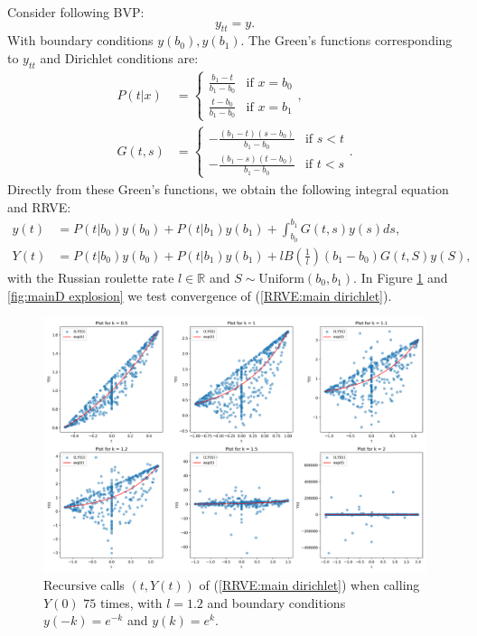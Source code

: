 \documentclass[a4paper,12pt]{article}
\begin{document}
\begin{example}[Dirichlet $y_{tt}=y$] \label{main dirichlet}
  Consider following BVP:
  \begin{equation} \label{eq:main dirichlet}
    y_{tt}=y.
  \end{equation}
  With boundary conditions $y(b_{0}),y(b_{1})$. The Green's functions corresponding to $y_{tt}$ and Dirichlet conditions are:
  \begin{align}
    P(t|x) & = \begin{cases}
                 \frac{b_{1}-t}{b_{1}-b_{0}} & \text{if } x = b_{0} \\
                 \frac{t-b_{0}}{b_{1}-b_{0}} & \text{if } x = b_{1}
               \end{cases},       \\
    G(t,s) & = \begin{cases}
                 -\frac{(b_{1}-t)(s-b_{0})}{b_{1}-b_{0}} & \text{if } s<t \\
                 -\frac{(b_{1}-s)(t-b_{0})}{b_{1}-b_{0}} & \text{if } t<s
               \end{cases}.
  \end{align}
  Directly from these Green's functions, we obtain the following integral equation and RRVE:
  \begin{align} \label{inteq:main dirichlet}
    y(t) & = P(t|b_{0}) y(b_{0}) + P(t|b_{1}) y(b_{1}) +
    \int_{b_{0}}^{b_{1}} G(t,s)y(s) ds,                  \\
    Y(t) & = P(t|b_{0}) y(b_{0}) + P(t|b_{1}) y(b_{1})
    + l B\left(\frac{1}{l} \right)(b_{1}-b_{0}) G(t,S)y(S) , \label{RRVE:main dirichlet}
  \end{align}
  with the Russian roulette rate $l \in \mathbb{R}$  and
  $S \sim \text{Uniform}(b_{0},b_{1})$. In Figure \ref{fig:plots/main_dirichlet_viz.png} and \ref{fig:mainD explosion}
  we test convergence of (\ref{RRVE:main dirichlet}).
\end{example}

\begin{figure}[h!]
  \centering
  \includegraphics[width=\textwidth]{plots/main_dirichlet_viz.png}
  \caption{Recursive calls $(t,Y(t))$ of (\ref{RRVE:main dirichlet}) when
  calling $Y(0)$ $75$ times, with $l=1.2$ and boundary conditions
  $y(-k)=e^{-k}$ and $y(k)=e^{k}$.
  }
  \label{fig:plots/main_dirichlet_viz.png}
\end{figure}
\end{document}
